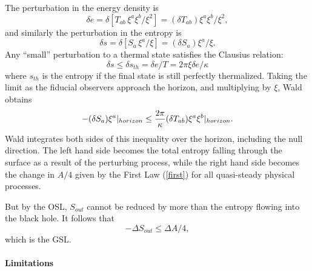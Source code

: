 \documentclass{article}
\begin{document}
The perturbation in the energy density is
\begin{equation}
\delta e = \delta [T_{ab}\,\xi^a \xi^b / \xi^2] = (\delta T_{ab}) \xi^a \xi^b / \xi^2,
\end{equation}
and similarly the perturbation in the entropy is
\begin{equation}
\delta s = \delta [S_{a}\,\xi^a / \xi] = (\delta S_{a}) \xi^a / \xi.
\end{equation}
Any ``small'' perturbation to a thermal state satisfies the Clausius relation:
\begin{equation}\label{Clausius}
\delta s \le \delta s_{th} = \delta e / T = 2\pi \xi \delta e / \kappa
\end{equation}
where $s_{th}$ is the entropy if the final state is still perfectly thermalized.  Taking the limit as the fiducial observers approach the horizon, and multiplying by $\xi$, Wald obtains
\begin{equation}\label{tofirst}
-(\delta S_a) \xi^a |_{horizon} \le 
{2\pi \over \kappa} (\delta T_{ab})\xi^a \xi^b |_{horizon}.
\end{equation}
Wald integrates both sides of this inequality over the horizon, including the null direction.  The left hand side becomes the total entropy falling through the surface as a result of the perturbing process, while the right hand side becomes the change in $A/4$ given by the First Law (\ref{first}) for all quasi-steady physical processes.

But by the OSL, $S_{out}$ cannot be reduced by more than the entropy flowing into the black hole.  It follows that
\begin{equation}\label{GSLresult}
-\Delta S_{out} \le \Delta A/4,
\end{equation}
which is the GSL.

\paragraph{Limitations}
\end{document}
